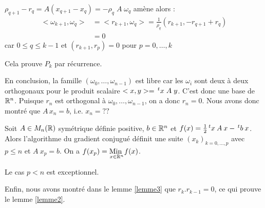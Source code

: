 \begin{preuve}
\begin{enumerate}[label=•]
            \vspace{0.4cm}
            $\rho_{q+1} - r_q = A(x_{q+1}-x_q) = - \rho_q \; A \; \omega_q$ amène alors :
            \begin{align*}
                <\omega_{k+1},\omega_q> & = <r_{k+1}, \omega_q> = \frac{1}{\rho_q}(r_{k+1},-r_{q+1}+r_q) \\
                & = 0
            \end{align*}
            car $0 \leq q \leq k-1$ et $(r_{k+1},r_p) = 0$ pour $p = 0,\dots,k$

            Cela prouve $P_k$ par récurrence.
    \end{enumerate}
\end{preuve}

En conclusion, la famille $(\omega_0, \dots, \omega_{n-1})$ est libre car les $\omega_i$ sont
deux à deux orthogonaux pour le produit scalaire $<x,y> = \,^tx \; A \; y$. C'est donc une
base de $\mathbb{R}^n$. Puisque $r_n$ est orthogonal à $\omega_0, \dots, \omega_{n-1}$, on a donc
$r_n=0$. Nous avons donc montré que $A \, x_n = b$, i.e. $x_n=??$

\begin{ftheo}
    Soit $A \in M_n(\mathbb{R})$ symétrique définie positive, $b \in \mathbb{R}^n$ et ${f(x) = \frac{1}{2} \,^tx \: A \: x - \,^tb \: x}$.
    Alors l'algorithme du gradient conjugué définit une suite $(x_k)_{k=0,\dots,p}$ avec
    $p \leq n$ et $A \: x_p = b$. On a $f(x_p) = \underset{x \in \mathbb{R}^n}{\text{Min }} f(x)$.
\end{ftheo}

\begin{remark}
    Le cas $p<n$ est exceptionnel.
\end{remark}

Enfin, nous avons montré dans le lemme \ref{lemme3} que $r_k.r_{k-1}=0$, ce qui prouve le lemme
\ref{lemme2}.

